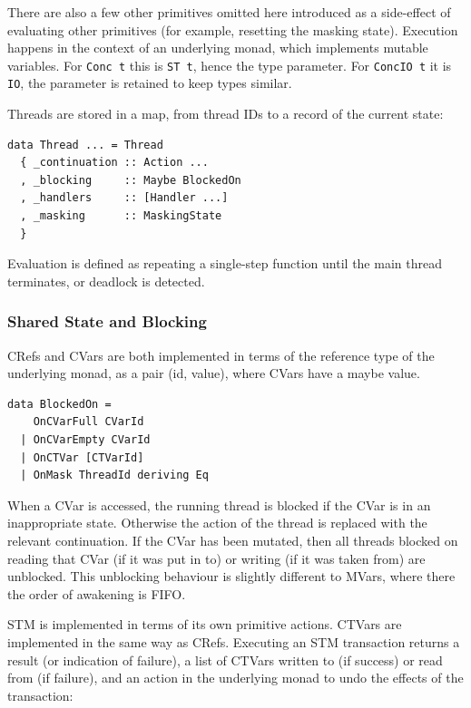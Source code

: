 There are also a few other primitives omitted here introduced as a
side-effect of evaluating other primitives (for example, resetting the
masking state). Execution happens in the context of an underlying
monad, which implements mutable variables. For \texttt{Conc t} this is
\texttt{ST t}, hence the type parameter. For \texttt{ConcIO t} it is
\texttt{IO}, the parameter is retained to keep types similar.

Threads are stored in a map, from thread IDs to a record of the
current state:

\begin{verbatim}
data Thread ... = Thread
  { _continuation :: Action ...
  , _blocking     :: Maybe BlockedOn
  , _handlers     :: [Handler ...]
  , _masking      :: MaskingState
  }
\end{verbatim}

Evaluation is defined as repeating a single-step function until the
main thread terminates, or deadlock is detected.

\subsubsection*{Shared State and Blocking}
\label{sec:prelims-dejafu-impl-state}

CRefs and CVars are both implemented in terms of the reference type of
the underlying monad, as a pair (id, value), where CVars have a maybe
value.

\begin{verbatim}
data BlockedOn =
    OnCVarFull CVarId
  | OnCVarEmpty CVarId
  | OnCTVar [CTVarId]
  | OnMask ThreadId deriving Eq
\end{verbatim}

When a CVar is accessed, the running thread is blocked if the CVar is
in an inappropriate state. Otherwise the action of the thread is
replaced with the relevant continuation. If the CVar has been mutated,
then all threads blocked on reading that CVar (if it was put in to) or
writing (if it was taken from) are unblocked. This unblocking
behaviour is slightly different to MVars, where there the order of
awakening is FIFO.

STM is implemented in terms of its own primitive actions. CTVars are
implemented in the same way as CRefs. Executing an STM transaction
returns a result (or indication of failure), a list of CTVars written
to (if success) or read from (if failure), and an action in the
underlying monad to undo the effects of the transaction:

